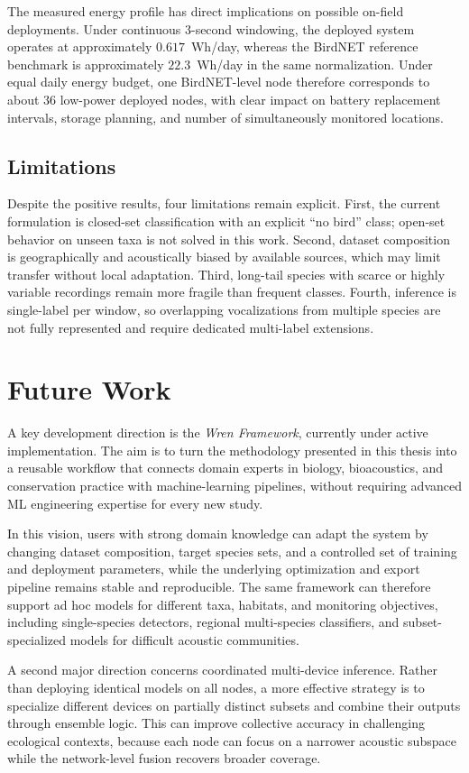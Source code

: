\documentclass[a4paper,singleside,12pt]{report} %
\begin{document}
	The measured energy profile has direct implications on possible on-field deployments. Under continuous 3-second windowing, the deployed system operates at approximately \(0.617\)~Wh/day, whereas the BirdNET reference benchmark is approximately \(22.3\)~Wh/day in the same normalization. Under equal daily energy budget, one BirdNET-level node therefore corresponds to about 36 low-power deployed nodes, with clear impact on battery replacement intervals, storage planning, and number of simultaneously monitored locations.

	\subsection{Limitations}
	Despite the positive results, four limitations remain explicit. First, the current formulation is closed-set classification with an explicit ``no bird'' class; open-set behavior on unseen taxa is not solved in this work. Second, dataset composition is geographically and acoustically biased by available sources, which may limit transfer without local adaptation. Third, long-tail species with scarce or highly variable recordings remain more fragile than frequent classes. Fourth, inference is single-label per window, so overlapping vocalizations from multiple species are not fully represented and require dedicated multi-label extensions.
	\section{Future Work}
	A key development direction is the \emph{Wren Framework}, currently under active implementation. The aim is to turn the methodology presented in this thesis into a reusable workflow that connects domain experts in biology, bioacoustics, and conservation practice with machine-learning pipelines, without requiring advanced ML engineering expertise for every new study.

	In this vision, users with strong domain knowledge can adapt the system by changing dataset composition, target species sets, and a controlled set of training and deployment parameters, while the underlying optimization and export pipeline remains stable and reproducible. The same framework can therefore support ad hoc models for different taxa, habitats, and monitoring objectives, including single-species detectors, regional multi-species classifiers, and subset-specialized models for difficult acoustic communities.

	A second major direction concerns coordinated multi-device inference. Rather than deploying identical models on all nodes, a more effective strategy is to specialize different devices on partially distinct subsets and combine their outputs through ensemble logic. This can improve collective accuracy in challenging ecological contexts, because each node can focus on a narrower acoustic subspace while the network-level fusion recovers broader coverage.
\end{document}
